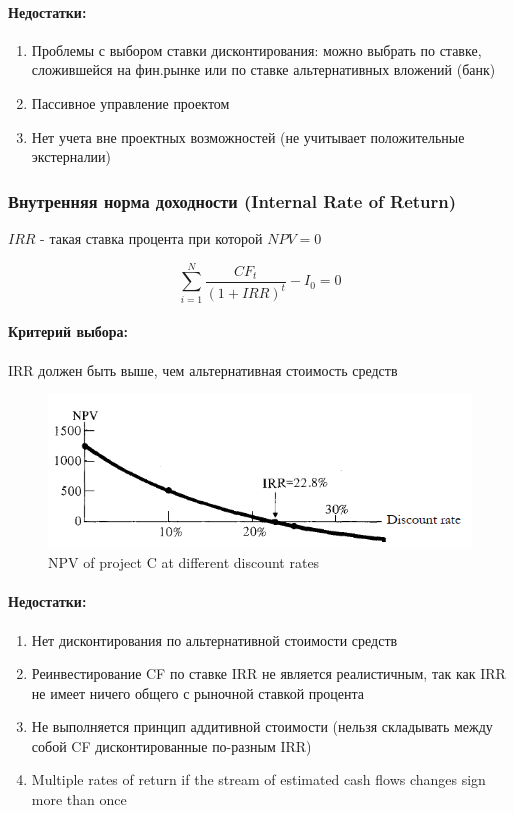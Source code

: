 \documentclass[a4paper,12pt]{article} %
\begin{document}
 \paragraph{    Недостатки:  }
 \begin{enumerate}
 	\item Проблемы с выбором ставки дисконтирования: можно выбрать по ставке, сложившейся на фин.рынке или по ставке альтернативных вложений (банк)
 	\item Пассивное управление проектом
 	\item Нет учета вне проектных возможностей (не учитывает положительные экстерналии)
 	
 \end{enumerate}
 
  
  \subsubsection{Внутренняя норма доходности (Internal Rate of Return) }
  
$   IRR $  - такая ставка процента при которой $ NPV = 0  $
  
  \[  \sum_{i=1}^{N} \dfrac{CF_t}{(1+ IRR)^t} -I_0 = 0 \] 
  
   \paragraph{ Критерий выбора:     }  IRR должен быть выше, чем
  альтернативная стоимость средств
  
  \begin{figure}[h!]
  	\centering
  	\includegraphics[width=0.7\linewidth]{screenshot006}
  	\caption{NPV of project C at different discount rates}
  	\label{fig:screenshot006}
  \end{figure}
  
   \paragraph{ Недостатки:     }

\begin{enumerate}
	\item 
 Нет дисконтирования  по альтернативной стоимости средств 
 	\item 
 Реинвестирование CF по ставке IRR  не является реалистичным, так как IRR не имеет ничего общего с рыночной ставкой  процента 
 	\item 
 Не выполняется принцип аддитивной стоимости (нельзя складывать между собой CF дисконтированные по-разным IRR) 
  	\item Multiple rates of
  	return if the stream of estimated cash flows changes sign more than once

\end{enumerate}
\end{document}
